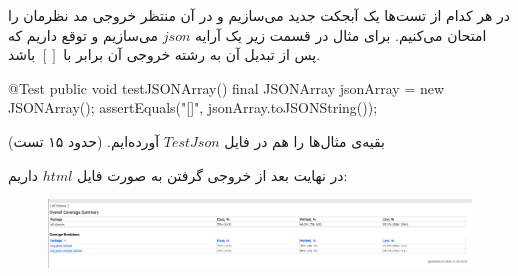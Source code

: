 در هر کدام از تست‌ها یک آبجکت جدید می‌سازیم و در آن منتظر خروجی مد نظرمان را امتحان می‌کنیم. برای مثال در قسمت زیر یک آرایه  $json$ می‌سازیم و توقع داریم که پس از تبدیل آن به رشته خروجی آن برابر با $[]$ باشد.
\begin{Verbatim*}[tabsize=4]
@Test
public void testJSONArray() {
	final JSONArray jsonArray = new JSONArray();
	assertEquals("[]", jsonArray.toJSONString());
}

\end{Verbatim*}

بقیه‌ی مثال‌ها را هم در فایل $TestJson$ آورده‌ایم. (حدود ۱۵ تست)

در نهایت بعد از خروجی گرفتن به صورت فایل $html$ داریم:

\begin{figure}[!hbpt]
	\includegraphics[width=\linewidth]{./img/4.png}
\end{figure}

	